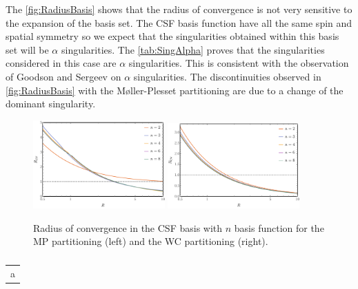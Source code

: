 \documentclass[11pt,a4paper]{article}
\begin{document}
The \autoref{fig:RadiusBasis} shows that the radius of convergence is not very sensitive to the expansion of the basis set. The CSF basis function have all the same spin and spatial symmetry so we expect that the singularities obtained within this basis set will be $\alpha$ singularities. The \autoref{tab:SingAlpha} proves that the singularities considered in this case are $\alpha$ singularities. This is consistent with the observation of Goodson and Sergeev \cite{Goodson_2004} on $\alpha$ singularities. The discontinuities observed in \autoref{fig:RadiusBasis} with the M{\o}ller-Plesset partitioning are due to a change of the dominant singularity. \\

\begin{figure}[h!]
    \centering
    \includegraphics[width=0.45\textwidth]{MPlargebasis.pdf}
    \includegraphics[width=0.45\textwidth]{WCElargebasis.pdf}
    \caption{\centering Radius of convergence in the CSF basis with $n$ basis function for the MP partitioning (left) and the WC partitioning (right).}
    \label{fig:RadiusBasis}
\end{figure}

\begin{table}[h!]
\centering
\caption{\centering }
\begin{tabular}{c}
a
\end{tabular}
\label{tab:SingAlpha}
\end{table}
\end{document}
